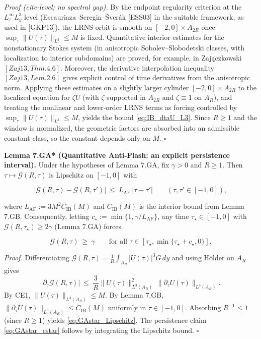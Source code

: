 \documentclass[
  11pt,
]{article}
\begin{document}
\emph{Proof (cite-level; no spectral gap).} By the endpoint regularity criterion at the \(L^\infty_\tau L^3_y\) level (Escauriaza--Seregin--Šverák {[}ESS03{]} in the suitable framework, as used in {[}GKP13{]}), the LRNS orbit is smooth on \([-2,0]\times A_{2R}\) once \(\sup_{\tau}\|U(\tau)\|_{L^3}\le M\) is fixed. Quantitative interior estimates for the nonstationary Stokes system (in anisotropic Sobolev--Slobodetski classes, with localization to interior subdomains) are proved, for example, in Zajączkowski \([Zaj13, Thm. 4.6]\). Moreover, the derivative interpolation inequality \([Zaj13, Lem. 2.6]\) gives explicit control of time derivatives from the anisotropic norm. Applying these estimates on a slightly larger cylinder \([-2,0]\times A_{2R}\) to the localized equation for \(\zeta U\) (with \(\zeta\) supported in \(A_{2R}\) and \(\zeta\equiv 1\) on \(A_R\)), and treating the nonlinear and lower-order LRNS terms as forcing controlled by \(\sup_{\tau}\|U(\tau)\|_{L^3}\le M\), yields the bound \eqref{eq:IB_dtaU_L3}. Since \(R\ge 1\) and the window is normalized, the geometric factors are absorbed into an admissible constant class, so the constant depends only on \(M\). \(\square\)

\textbf{Lemma 7.GA* (Quantitative Anti-Flash: an explicit persistence interval).} Under the hypotheses of Lemma 7.GA, fix \(\gamma>0\) and \(R\ge 1\). Then \(\tau\mapsto \mathcal G(R,\tau)\) is Lipschitz on \([-1,0]\) with

\begin{equation}
\big|\mathcal G(R,\tau)-\mathcal G(R,\tau')\big|\ \le\ L_{\mathrm{AF}}\,|\tau-\tau'|\qquad(\tau,\tau'\in[-1,0]),
\tag{7.GA*}\label{eq:GAstar_Lipschitz}
\end{equation}

where \(L_{\mathrm{AF}}:=3M^2C_{\mathrm{IB}}(M)\) and \(C_{\mathrm{IB}}(M)\) is the interior bound from Lemma 7.GB. Consequently, letting \(c_\star:=\min\{1,\gamma/L_{\mathrm{AF}}\}\), any time \(\tau_\star\in[-1,0]\) with \(\mathcal G(R,\tau_\star)\ge 2\gamma\) (Lemma 7.GA) forces

\begin{equation}
\mathcal G(R,\tau)\ \ge\ \gamma\qquad\text{for all }\tau\in[\tau_\star,\min\{\tau_\star+c_\star,0\}].
\tag{7.GA*+}\label{eq:GAstar_cstar}
\end{equation}

\emph{Proof.} Differentiating \(\mathcal G(R,\tau)=\frac1R\int_{A_R}|U(\tau)|^3G\,dy\) and using Hölder on \(A_R\) gives \[
|\partial_\tau \mathcal G(R,\tau)|\ \le\ \frac3R\|U(\tau)\|_{L^3(A_R)}^2\,\|\partial_\tau U(\tau)\|_{L^3(A_R)}.
\] By CE1, \(\|U(\tau)\|_{L^3(A_R)}\le M\). By Lemma 7.GB, \(\|\partial_\tau U(\tau)\|_{L^3(A_R)}\le C_{\mathrm{IB}}(M)\) uniformly in \(\tau\in[-1,0]\). Absorbing \(R^{-1}\le 1\) (since \(R\ge 1\)) yields \eqref{eq:GAstar_Lipschitz}. The persistence claim \eqref{eq:GAstar_cstar} follows by integrating the Lipschitz bound. \(\square\)
\end{document}
